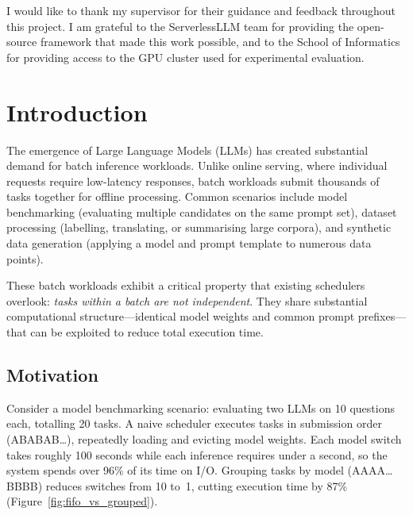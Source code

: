 \documentclass[logo,bsc,singlespacing,parskip,online]{infthesis}
\begin{document}
\begin{preliminary}
\standarddeclaration

\begin{acknowledgements}
I would like to thank my supervisor for their guidance and feedback throughout this project. I am grateful to the ServerlessLLM team for providing the open-source framework that made this work possible, and to the School of Informatics for providing access to the GPU cluster used for experimental evaluation.
\end{acknowledgements}

\tableofcontents

\end{preliminary}


\chapter{Introduction}

The emergence of Large Language Models (LLMs) has created substantial demand for batch inference workloads. Unlike online serving, where individual requests require low-latency responses, batch workloads submit thousands of tasks together for offline processing. Common scenarios include model benchmarking (evaluating multiple candidates on the same prompt set), dataset processing (labelling, translating, or summarising large corpora), and synthetic data generation (applying a model and prompt template to numerous data points).

These batch workloads exhibit a critical property that existing schedulers overlook: \textit{tasks within a batch are not independent}. They share substantial computational structure---identical model weights and common prompt prefixes---that can be exploited to reduce total execution time.

\section{Motivation}

Consider a model benchmarking scenario: evaluating two LLMs on 10 questions each, totalling 20 tasks. A naive scheduler executes tasks in submission order (ABABAB\ldots), repeatedly loading and evicting model weights. Each model switch takes roughly 100 seconds while each inference requires under a second, so the system spends over 96\% of its time on I/O. Grouping tasks by model (AAAA\ldots BBBB) reduces switches from 10 to~1, cutting execution time by 87\% (Figure~\ref{fig:fifo_vs_grouped}).
\end{document}
